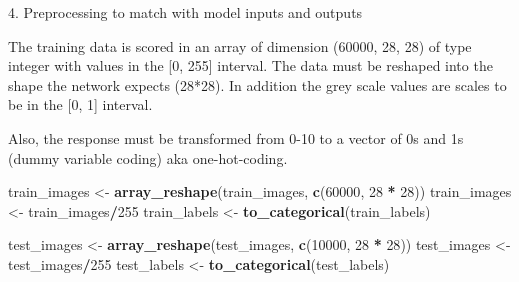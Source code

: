 \documentclass[10pt,ignorenonframetext,]{beamer}
\newenvironment{Shaded}{\begin{snugshade}}{\end{snugshade}}
\newcommand{\DecValTok}[1]{\textcolor[rgb]{0.00,0.00,0.81}{#1}}
\newcommand{\KeywordTok}[1]{\textcolor[rgb]{0.13,0.29,0.53}{\textbf{#1}}}
\newcommand{\NormalTok}[1]{#1}
\newcommand{\OperatorTok}[1]{\textcolor[rgb]{0.81,0.36,0.00}{\textbf{#1}}}
\newcommand{\StringTok}[1]{\textcolor[rgb]{0.31,0.60,0.02}{#1}}
\begin{document}
\begin{frame}[fragile]

\begin{block}{4. Preprocessing to match with model inputs and outputs}

The training data is scored in an array of dimension (60000, 28, 28) of
type integer with values in the {[}0, 255{]} interval. The data must be
reshaped into the shape the network expects (28*28). In addition the
grey scale values are scales to be in the {[}0, 1{]} interval.

Also, the response must be transformed from 0-10 to a vector of 0s and
1s (dummy variable coding) aka one-hot-coding.

\scriptsize

\begin{Shaded}
\begin{Highlighting}[]
\NormalTok{train_images <-}\StringTok{ }\KeywordTok{array_reshape}\NormalTok{(train_images, }\KeywordTok{c}\NormalTok{(}\DecValTok{60000}\NormalTok{, }\DecValTok{28} \OperatorTok{*}\StringTok{ }\DecValTok{28}\NormalTok{))}
\NormalTok{train_images <-}\StringTok{ }\NormalTok{train_images}\OperatorTok{/}\DecValTok{255}
\NormalTok{train_labels <-}\StringTok{ }\KeywordTok{to_categorical}\NormalTok{(train_labels)}

\NormalTok{test_images <-}\StringTok{ }\KeywordTok{array_reshape}\NormalTok{(test_images, }\KeywordTok{c}\NormalTok{(}\DecValTok{10000}\NormalTok{, }\DecValTok{28} \OperatorTok{*}\StringTok{ }\DecValTok{28}\NormalTok{))}
\NormalTok{test_images <-}\StringTok{ }\NormalTok{test_images}\OperatorTok{/}\DecValTok{255}
\NormalTok{test_labels <-}\StringTok{ }\KeywordTok{to_categorical}\NormalTok{(test_labels)}
\end{Highlighting}
\end{Shaded}

\end{block}

\end{frame}
\end{document}
